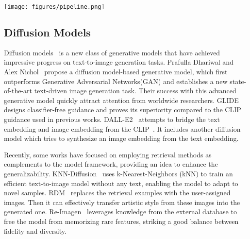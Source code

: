 \documentclass[10pt,twocolumn,letterpaper]{article}
\newcommand{\name}{ReMoDiffuse\xspace}
\begin{document}
\begin{figure*}[t]
    \centering
    \texttt{[image: figures/pipeline.png]}
    \caption{\textbf{Overview} of the proposed \name. a) Hybrid retrieval database stores various features of each training data. The pre-processed text feature and relative difference of motion length are sent to calculate the similarity with the given language description. The most similar ones are fed into the semantics-modulated transformer (SMT), serving as additional clues for motion generation. b) Semantics-modulated transformer incorporates $N$ identical decoder layers, including a semantics-modulated attention (SMA) layer and an FFN layer. The figure shows the detailed architecture of SMA module. CLIP's extracted text features $f_{\mathrm{prompt}}$ from the given prompt, features $R^t$ and $R^m$ from the retrieved samples, and current motion features $f_{\Theta}$ will further refine the noised motion sequence.  c) To synthesize diverse and realistic motion sequences, starting from the pure noised sample, the motion transformer repeatedly eliminates the noise. To better mix outputs under different combinations of conditions, we suggest a training strategy to find the optimal hyper-parameters $w_1,w_2,w_3$ and $w_4$.}
    \label{fig:pipeline}
\end{figure*}

\subsection{Diffusion Models}

Diffusion models~\cite{ho2020denoising, nichol2021improved} is a new class of generative models that have achieved impressive progress on text-to-image generation tasks. Prafulla Dhariwal and Alex Nichol~\cite{dhariwal2021diffusion} propose a diffusion model-based generative model, which first outperforms Generative Adversarial Networks(GAN) and establishes a new state-of-the-art text-driven image generation task. Their success with this advanced generative model quickly attract attention from worldwide researchers. GLIDE~\cite{nichol2021glide} designs classifier-free guidance and proves its superiority compared to the CLIP guidance used in previous works. DALL-E2~\cite{ramesh2022hierarchical} attempts to bridge the text embedding and image embedding from the CLIP~\cite{radford2021learning}. It includes another diffusion model which tries to synthesize an image embedding from the text embedding. 

Recently, some works have focused on employing retrieval methods as complements to the model framework, providing an idea to enhance the generalizability. KNN-Diffusion~\cite{sheynin2022knn} uses k-Nearest-Neighbors (kNN) to train an efficient text-to-image model without any text, enabling the model to adapt to novel samples. RDM~\cite{blattmann2022retrieval} replaces the retrieval examples with the user-assigned images. Then it can effectively transfer artistic style from these images into the generated one. Re-Imagen~\cite{chen2022re} leverages knowledge from the external database to free the model from memorizing rare features, striking a good balance between fidelity and diversity. 
\end{document}
